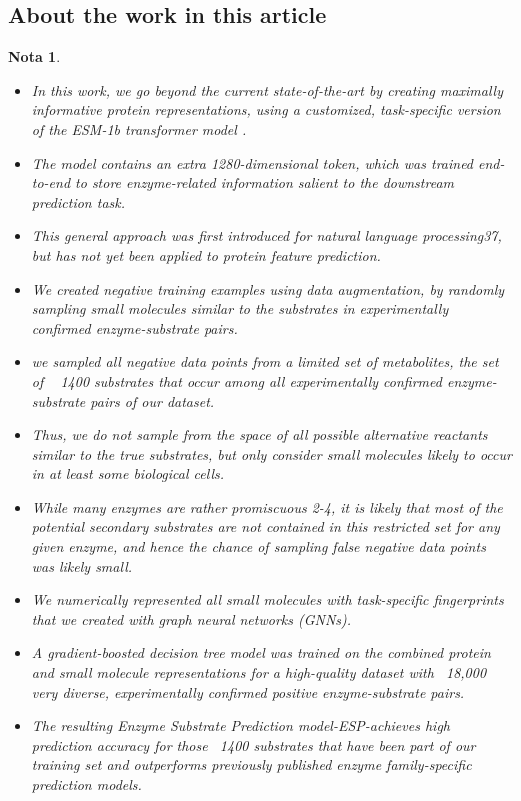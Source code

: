 \documentclass[12pt]{article}
\newtheorem{Note}{Nota}%
\begin{document}
\subsection{About the work in this article}

\begin{Note}
\begin{itemize}

\item In this work, we go beyond the current state-of-the-art by creating maximally informative protein representations, using a customized,  task-specific version of the ESM-1b transformer model \cite{2.34}. 

\item The model contains an extra 1280-dimensional token, which was trained end-to-end to store enzyme-related information salient to the downstream prediction task. 

\item This general approach was first introduced for natural language processing37, but has not yet been applied to protein feature prediction. 

\item We created negative training examples using data augmentation, by randomly sampling small molecules similar to the substrates in experimentally confirmed enzyme-substrate pairs.

\item we sampled all negative data points from a limited set of metabolites, the set of ~ 1400 substrates that occur among all experimentally confirmed enzyme-substrate pairs of our dataset. 

\item Thus, we do not sample from the space of all possible alternative reactants similar to the true substrates, but only consider small molecules likely to occur in at least some biological cells. 

\item While many enzymes are rather promiscuous 2-4, it is likely that most of the potential secondary substrates are not contained in this restricted set for any given enzyme, and hence the chance of sampling false negative data points was likely small. 

\item We numerically represented all small molecules with task-specific fingerprints that we created with graph neural networks (GNNs)\cite{2.38,2.39,2.40}. 

\item A gradient-boosted decision tree model was trained on the combined protein and small molecule representations for a high-quality dataset with ~18,000 very diverse, experimentally confirmed positive enzyme-substrate pairs. 

\item The resulting Enzyme Substrate Prediction model-ESP-achieves high prediction accuracy for those ~1400 substrates that have been part of our training set and outperforms previously published enzyme family-specific prediction models.
\end{itemize}

\end{Note}
\end{document}
